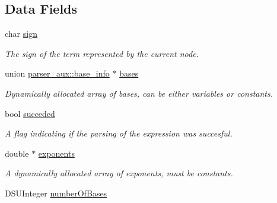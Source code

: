 \subsection*{Data Fields}
\begin{DoxyCompactItemize}
\item 
\hypertarget{structparser__aux_af58136c20626613559589ae2ac0aace8}{
char \hyperlink{structparser__aux_af58136c20626613559589ae2ac0aace8}{sign}}
\label{structparser__aux_af58136c20626613559589ae2ac0aace8}

\begin{DoxyCompactList}\small\item\em The sign of the term represented by the current node. \item\end{DoxyCompactList}\item 
\hypertarget{structparser__aux_a51143f67fc1a8646e37748f07f121abb}{
union \hyperlink{unionparser__aux_1_1base__info}{parser\_\-aux::base\_\-info} $\ast$ \hyperlink{structparser__aux_a51143f67fc1a8646e37748f07f121abb}{bases}}
\label{structparser__aux_a51143f67fc1a8646e37748f07f121abb}

\begin{DoxyCompactList}\small\item\em Dynamically allocated array of bases, can be either variables or constants. \item\end{DoxyCompactList}\item 
\hypertarget{structparser__aux_aeb0b956846d368445f544330406728e7}{
bool \hyperlink{structparser__aux_aeb0b956846d368445f544330406728e7}{succeded}}
\label{structparser__aux_aeb0b956846d368445f544330406728e7}

\begin{DoxyCompactList}\small\item\em A flag indicating if the parsing of the expression was succesful. \item\end{DoxyCompactList}\item 
\hypertarget{structparser__aux_ad4a14cee9667439f874f08eea0df7df3}{
double $\ast$ \hyperlink{structparser__aux_ad4a14cee9667439f874f08eea0df7df3}{exponents}}
\label{structparser__aux_ad4a14cee9667439f874f08eea0df7df3}

\begin{DoxyCompactList}\small\item\em A dynamically allocated array of exponents, must be constants. \item\end{DoxyCompactList}\item 
\hypertarget{structparser__aux_a766614a87ce6e43661815b8f9f3560f7}{
DSUInteger \hyperlink{structparser__aux_a766614a87ce6e43661815b8f9f3560f7}{numberOfBases}}
\label{structparser__aux_a766614a87ce6e43661815b8f9f3560f7}


\end{DoxyCompactItemize}
